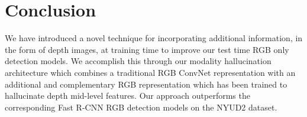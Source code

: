 \documentclass[10pt,twocolumn,letterpaper]{article}
\begin{document}
\section{Conclusion}
We have introduced a novel technique for incorporating additional information, in the form of depth images, at training time to improve our test time RGB only detection models. We accomplish this through our modality hallucination architecture which combines a traditional RGB ConvNet representation with an additional and complementary RGB representation which has been trained to hallucinate depth mid-level features. Our approach outperforms the corresponding Fast R-CNN RGB detection models on the NYUD2 dataset.
{\small

} 
\end{document}
